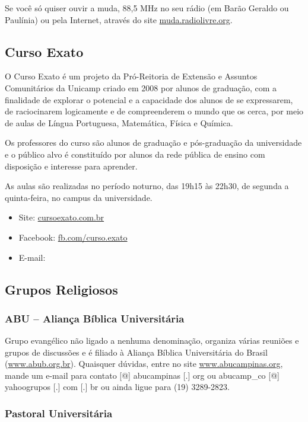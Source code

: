 Se você só quiser ouvir a muda, 88,5 MHz no seu rádio (em Barão Geraldo ou
Paulínia) ou pela Internet, através do site \url{muda.radiolivre.org}.

\subsection{Curso Exato}

O Curso Exato é um projeto da Pró-Reitoria de Extensão e Assuntos Comunitários
da Unicamp criado em 2008 por alunos de graduação, com a finalidade de explorar
o potencial e a capacidade dos alunos de se expressarem, de raciocinarem
logicamente e de compreenderem o mundo que os cerca, por meio de aulas de Língua
Portuguesa, Matemática, Física e Química.

Os professores do curso são alunos de graduação e pós-graduação da universidade
e o público alvo é constituído por alunos da rede pública de ensino com
disposição e interesse para aprender.

As aulas são realizadas no período noturno, das 19h15 às 22h30, de segunda
a quinta-feira, no campus da universidade.

\begin{itemize}
\item Site: \url{cursoexato.com.br}
\item Facebook: \url{fb.com/curso.exato}
\item E-mail: 
\end{itemize}

\subsection{Grupos Religiosos}

\subsubsection{ABU -- Aliança Bíblica Universitária}

Grupo evangélico não ligado a nenhuma denominação, organiza várias reuniões
e grupos de discussões e é filiado à Aliança Bíblica Universitária do Brasil
(\url{www.abub.org.br}). Quaisquer dúvidas, entre no site
\url{www.abucampinas.org}, mande um e-mail para contato [@] abucampinas
[.] org ou abucamp\_co [@] yahoogrupos [.] com [.] br ou ainda ligue para (19)
3289-2823.

\subsubsection{Pastoral Universitária}

